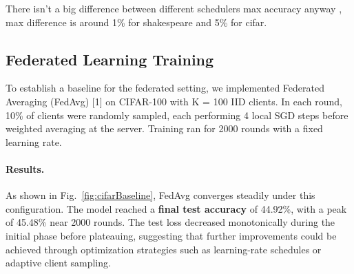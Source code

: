 \documentclass[10pt,twocolumn,letterpaper]{article}
\begin{document}
There isn't a big difference between different schedulers max accuracy anyway , max difference is around 1\% for shakespeare and 5\% for cifar.


\subsection{Federated Learning Training}
To establish a baseline for the federated setting, we implemented Federated Averaging (FedAvg) [1] on CIFAR-100 with K = 100 IID clients. In each round, 10\% of clients were randomly sampled, each performing 4 local SGD steps before weighted averaging at the server. Training ran for 2000 rounds with a fixed learning rate.

\paragraph{Results.} As shown in Fig.~\ref{fig:cifarBaseline}, FedAvg converges steadily under this configuration. The model reached a \textbf{final test accuracy} of 44.92\%, with a peak of 45.48\% near 2000 rounds. The test loss decreased monotonically during the initial phase before plateauing, suggesting that further improvements could be achieved through optimization strategies such as learning-rate schedules or adaptive client sampling.
\end{document}
